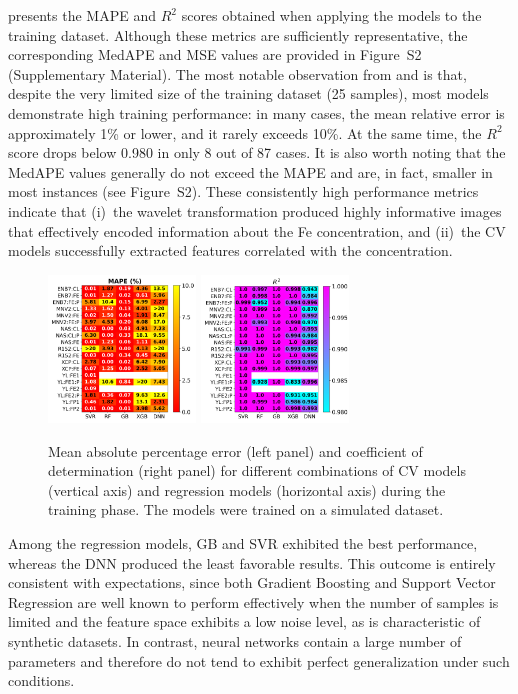 \documentclass[10pt]{iopart}
\begin{document}
 presents the MAPE and $R^2$ scores obtained when applying the models to the training dataset.
Although these metrics are sufficiently representative, the corresponding MedAPE and MSE values are provided in Figure~S2 (Supplementary Material).
The most notable observation from  and  is that,
despite the very limited size of the training dataset (25 samples),
most models demonstrate high training performance:
in many cases, the mean relative error is approximately 1\% or lower,
and it rarely exceeds 10\%. At the same time, the $R^2$ score drops below 0.980 in only 8 out of 87 cases.
It is also worth noting that the MedAPE values generally do not exceed the MAPE and are, in fact,
smaller in most instances (see Figure~S2).
These consistently high performance metrics indicate that
(i)~the wavelet transformation produced highly informative images that effectively encoded information about the Fe concentration,
and (ii)~the CV models successfully extracted features correlated with the concentration.

\begin{figure}
\centering
\includegraphics[width=0.35\textwidth]{Fig5a}
\includegraphics[width=0.35\textwidth]{Fig5b}
\caption{
Mean absolute percentage error (left panel) and coefficient of determination (right panel) for different combinations of CV models (vertical axis)
and regression models (horizontal axis) during the training phase. The models were trained on a simulated dataset.
}\label{Fig5}
\end{figure}

Among the regression models, GB and SVR exhibited the best performance,
whereas the DNN produced the least favorable results.
This outcome is entirely consistent with expectations,
since both Gradient Boosting and Support Vector Regression are well known to perform effectively
when the number of samples is limited and the feature space exhibits a low noise level, as is characteristic of synthetic datasets.
In contrast, neural networks contain a large number of parameters and therefore do not tend to exhibit perfect generalization under such conditions.
\end{document}
